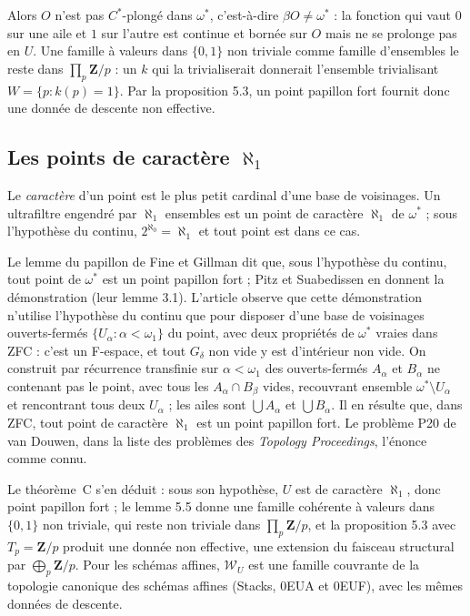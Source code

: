 \documentclass[11pt,a4paper]{amsart}
\theoremstyle{definition}
\theoremstyle{plain}
\theoremstyle{remark}
\newcommand{\Z}{\mathbf Z}
\begin{document}
Alors $O$ n'est pas $C^*$-plongé dans $\omega^*$, c'est-à-dire $\beta O\neq\omega^*$ : la fonction qui vaut $0$ sur une aile et $1$ sur l'autre est continue et bornée sur $O$ mais ne se prolonge pas en $U$. Une famille à valeurs dans $\{0,1\}$ non triviale comme famille d'ensembles le reste dans $\prod_p\Z/p$ : un $k$ qui la trivialiserait donnerait l'ensemble trivialisant $W=\{p:k(p)=1\}$. Par la proposition 5.3, un point papillon fort fournit donc une donnée de descente non effective.

\subsection{Les points de caractère $\aleph_1$}

Le \emph{caractère} d'un point est le plus petit cardinal d'une base de voisinages. Un ultrafiltre engendré par $\aleph_1$ ensembles est un point de caractère $\aleph_1$ de $\omega^*$ ; sous l'hypothèse du continu, $2^{\aleph_0}=\aleph_1$ et tout point est dans ce cas.

Le lemme du papillon de Fine et Gillman dit que, sous l'hypothèse du continu, tout point de $\omega^*$ est un point papillon fort ; Pitz et Suabedissen en donnent la démonstration (leur lemme 3.1). L'article observe que cette démonstration n'utilise l'hypothèse du continu que pour disposer d'une base de voisinages ouverts-fermés $\{U_\alpha:\alpha<\omega_1\}$ du point, avec deux propriétés de $\omega^*$ vraies dans ZFC : c'est un F-espace, et tout $G_\delta$ non vide y est d'intérieur non vide. On construit par récurrence transfinie sur $\alpha<\omega_1$ des ouverts-fermés $A_\alpha$ et $B_\alpha$ ne contenant pas le point, avec tous les $A_\alpha\cap B_\beta$ vides, recouvrant ensemble $\omega^*\setminus U_\alpha$ et rencontrant tous deux $U_\alpha$ ; les ailes sont $\bigcup A_\alpha$ et $\bigcup B_\alpha$. Il en résulte que, dans ZFC, tout point de caractère $\aleph_1$ est un point papillon fort. Le problème P20 de van Douwen, dans la liste des problèmes des \emph{Topology Proceedings}, l'énonce comme connu.

Le théorème~C s'en déduit : sous son hypothèse, $U$ est de caractère $\aleph_1$, donc point papillon fort ; le lemme 5.5 donne une famille cohérente à valeurs dans $\{0,1\}$ non triviale, qui reste non triviale dans $\prod_p\Z/p$, et la proposition 5.3 avec $T_p=\Z/p$ produit une donnée non effective, une extension du faisceau structural par $\bigoplus_p\Z/p$. Pour les schémas affines, $\mathcal W_U$ est une famille couvrante de la topologie canonique des schémas affines (Stacks, 0EUA et 0EUF), avec les mêmes données de descente.
\end{document}
